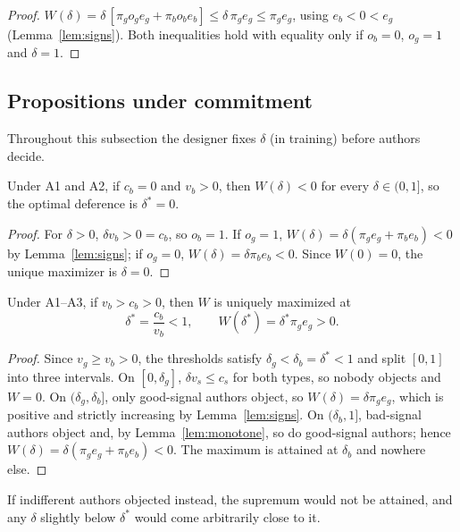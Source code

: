 \begin{proof}
$W(\delta) = \delta\,[\pi_g o_g e_g + \pi_b o_b e_b] \le \delta\, \pi_g e_g \le \pi_g e_g$,
using $e_b < 0 < e_g$ (Lemma~\ref{lem:signs}). Both inequalities hold with equality only if
$o_b = 0$, $o_g = 1$ and $\delta = 1$.
\end{proof}

\subsection{Propositions under commitment}

Throughout this subsection the designer fixes $\delta$ (in training) before authors decide.

\begin{proposition}\label{prop:cheaptalk}
Under A1 and A2, if $c_b = 0$ and $v_b > 0$, then $W(\delta) < 0$ for every $\delta \in (0,1]$,
so the optimal deference is $\delta^* = 0$.
\end{proposition}

\begin{proof}
For $\delta > 0$, $\delta v_b > 0 = c_b$, so $o_b = 1$. If $o_g = 1$,
$W(\delta) = \delta(\pi_g e_g + \pi_b e_b) < 0$ by Lemma~\ref{lem:signs}; if $o_g = 0$,
$W(\delta) = \delta \pi_b e_b < 0$. Since $W(0) = 0$, the unique maximizer is $\delta = 0$.
\end{proof}

\begin{proposition}\label{prop:optimal}
Under A1--A3, if $v_b > c_b > 0$, then $W$ is uniquely maximized at
\[
  \delta^* = \frac{c_b}{v_b} < 1, \qquad W(\delta^*) = \delta^* \pi_g e_g > 0 .
\]
\end{proposition}

\begin{proof}
Since $v_g \ge v_b > 0$, the thresholds satisfy $\delta_g < \delta_b = \delta^* < 1$ and split
$[0,1]$ into three intervals. On $[0, \delta_g]$, $\delta v_s \le c_s$ for both types, so nobody
objects and $W = 0$. On $(\delta_g, \delta_b]$, only good-signal authors object, so
$W(\delta) = \delta \pi_g e_g$, which is positive and strictly increasing by
Lemma~\ref{lem:signs}. On $(\delta_b, 1]$, bad-signal authors object and, by
Lemma~\ref{lem:monotone}, so do good-signal authors; hence
$W(\delta) = \delta(\pi_g e_g + \pi_b e_b) < 0$. The maximum is attained at $\delta_b$ and
nowhere else.
\end{proof}

If indifferent authors objected instead, the supremum would not be attained, and any $\delta$
slightly below $\delta^*$ would come arbitrarily close to it.


